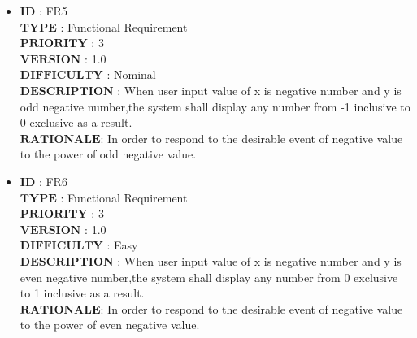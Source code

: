 \documentclass[a4paper, 11pt]{article}
\begin{document}
\begin{itemize}
   \item $\boldsymbol{ID}$\hspace{2.95cm}   : FR5\\
   $\boldsymbol{TYPE}$\hspace{2.2cm}   : Functional Requirement\\
   $\boldsymbol{PRIORITY}$\hspace{1.05cm} : 3\\
   $\boldsymbol{VERSION}$\hspace{1.25cm} : 1.0\\
   $\boldsymbol{DIFFICULTY}$\hspace{0.4cm} : Nominal \\
   $\boldsymbol{DESCRIPTION}$     :  When user input value of x is negative number and y is odd negative number,the system shall display any number from -1 inclusive to 0 exclusive as a result.\\
   $\boldsymbol{RATIONALE}$\hspace{0.8cm}: In order to respond to the desirable event of negative value to the power of odd negative value.\\
   
   \item $\boldsymbol{ID}$\hspace{2.95cm}   : FR6\\
    $\boldsymbol{TYPE}$\hspace{2.2cm}   : Functional Requirement\\
   $\boldsymbol{PRIORITY}$\hspace{1.05cm} : 3\\
   $\boldsymbol{VERSION}$\hspace{1.25cm} : 1.0\\
   $\boldsymbol{DIFFICULTY}$\hspace{0.4cm} : Easy \\
   $\boldsymbol{DESCRIPTION}$   :  When user input value of x is negative number and y is even negative number,the system shall display any number from 0 exclusive to 1 inclusive as a result.\\
   $\boldsymbol{RATIONALE}$\hspace{0.8cm}: In order to respond to the desirable event of negative value to the power of even negative value.\\
   

\end{itemize}
\end{document}
